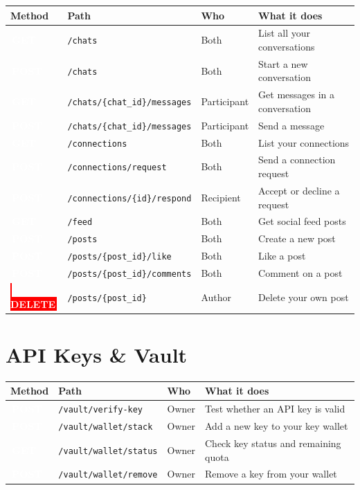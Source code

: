 \documentclass[12pt, a4paper]{report}
\newcommand{\code}[1]{\texttt{\small #1}}
\newcommand{\badge}[2]{%
  \colorbox{#1}{\textcolor{white}{\tiny\bfseries\,#2\,}}%
}
\newcommand{\GET}{\badge{successgr}{GET}}
\newcommand{\POST}{\badge{infoblue}{POST}}
\newcommand{\DELETE}{\badge{red}{DELETE}}
\begin{document}
{\begin{longtable}{p{1.5cm}p{5.5cm}p{2.2cm}p{5.5cm}}
\toprule
\textbf{Method} & \textbf{Path} & \textbf{Who} & \textbf{What it does} \\
\midrule
\endhead
\GET    & \code{/chats}                          & Both        & List all your conversations \\
\POST   & \code{/chats}                          & Both        & Start a new conversation \\
\GET    & \code{/chats/\{chat\_id\}/messages}    & Participant & Get messages in a conversation \\
\POST   & \code{/chats/\{chat\_id\}/messages}    & Participant & Send a message \\
\GET    & \code{/connections}                    & Both        & List your connections \\
\POST   & \code{/connections/request}            & Both        & Send a connection request \\
\POST   & \code{/connections/\{id\}/respond}     & Recipient   & Accept or decline a request \\
\GET    & \code{/feed}                           & Both        & Get social feed posts \\
\POST   & \code{/posts}                          & Both        & Create a new post \\
\POST   & \code{/posts/\{post\_id\}/like}        & Both        & Like a post \\
\POST   & \code{/posts/\{post\_id\}/comments}    & Both        & Comment on a post \\
\DELETE & \code{/posts/\{post\_id\}}             & Author      & Delete your own post \\
\bottomrule
\end{longtable}

\section{API Keys \& Vault}

\begin{longtable}{p{1.5cm}p{5.5cm}p{2.2cm}p{5.5cm}}
\toprule
\textbf{Method} & \textbf{Path} & \textbf{Who} & \textbf{What it does} \\
\midrule
\endhead
\POST & \code{/vault/verify-key}     & Owner & Test whether an API key is valid \\
\POST & \code{/vault/wallet/stack}   & Owner & Add a new key to your key wallet \\
\GET  & \code{/vault/wallet/status}  & Owner & Check key status and remaining quota \\
\POST & \code{/vault/wallet/remove}  & Owner & Remove a key from your wallet \\
\bottomrule
\end{longtable}

}
\end{document}
